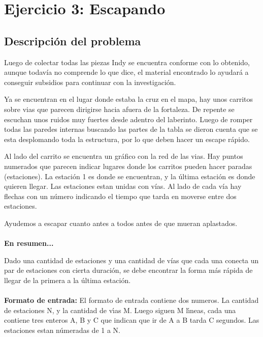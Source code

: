 \section{Ejercicio 3: Escapando}
    \subsection{Descripción del problema}

        \par Luego de colectar todas las piezas Indy se encuentra conforme con lo obtenido, aunque todavía no
        comprende lo que dice, el material encontrado lo ayudará a conseguir subsidios para continuar con la
        investigación.
        \par Ya se encuentran en el lugar donde estaba la cruz en el mapa, hay unos carritos sobre vias que parecen dirigirse hacia afuera de la fortaleza. De repente se escuchan unos ruidos muy fuertes desde adentro del laberinto. Luego de romper todas las paredes internas buscando las partes de la tabla se dieron cuenta que se esta desplomando toda la estructura, por lo que deben hacer un escape rápido. \par Al lado del carrito se encuentra un gráfico con la red de las vias. Hay puntos numerados que parecen indicar lugares donde los carritos pueden hacer paradas (estaciones). La estación 1 es donde se encuentran, y la última estación es donde quieren llegar. Las estaciones estan unidas con vías. Al lado de cada vía
        hay flechas con un número indicando el tiempo que tarda en moverse entre dos estaciones.
        \par Ayudemos a escapar cuanto antes a todos antes de que mueran aplastados.
        \\~\\
        \textbf{En resumen...}
        \par Dado una cantidad de estaciones y una cantidad de vías que cada una conecta un par de estaciones con cierta duración, se debe encontrar la forma más rápida de llegar de la primera a la última estación.
        \\~\\
        \textbf{Formato de entrada:} El formato de entrada contiene dos numeros. La cantidad de estaciones N, y la cantidad de vı́as M. Luego siguen M lı́neas, cada una contiene tres enteros A, B y C que indican que ir de A a B tarda C segundos. Las estaciones estan númeradas de 1 a N.
        

